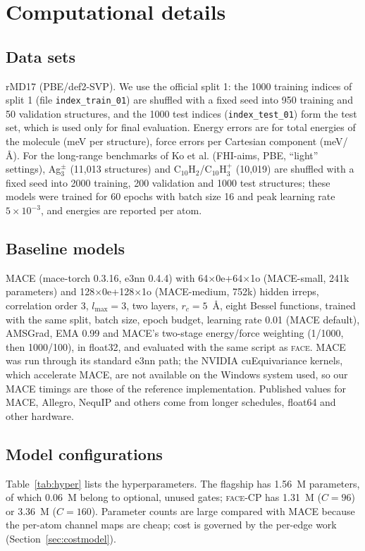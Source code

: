 \documentclass[journal=jctcce,manuscript=article,layout=traditional]{achemso}
\newcommand{\FACE}{\textup{\textsc{face}}}
\begin{document}
\section{Computational details}
\label{sec:compdetails}
\subsection{Data sets}
rMD17\cite{christensen2020rmd17} (PBE/def2-SVP). We use the official split 1: the 1000 training
indices of split 1 (file \texttt{index\_train\_01}) are shuffled with a fixed seed into 950 training and 50
validation structures, and the 1000 test indices (\texttt{index\_test\_01}) form the test set, which is used only for
final evaluation. Energy errors are for total energies of the molecule (meV per structure), force errors per
Cartesian component (meV/\AA). For the long-range benchmarks of Ko et al.\cite{ko2021} (FHI-aims, PBE, ``light''
settings), Ag$_3^{\pm}$ (11,013 structures) and C$_{10}$H$_2$/C$_{10}$H$_3^+$ (10,019) are shuffled with a fixed seed
into 2000 training, 200 validation and 1000 test structures; these models were trained for 60 epochs with batch size
16 and peak learning rate $5\times10^{-3}$, and energies are reported per atom.

\subsection{Baseline models}
MACE\cite{batatia2022mace} (mace-torch 0.3.16, e3nn 0.4.4) with 64$\times$0e+64$\times$1o
(MACE-small, 241k parameters) and 128$\times$0e+128$\times$1o (MACE-medium, 752k) hidden irreps, correlation order
3, $l_\text{max}=3$, two layers, $r_c=5$~\AA, eight Bessel functions, trained with the same split, batch size, epoch
budget, learning rate 0.01 (MACE default), AMSGrad, EMA 0.99 and MACE's two-stage energy/force weighting
(1/1000, then 1000/100), in float32, and evaluated with the same script as \FACE{}. MACE was run through its
standard e3nn path; the NVIDIA cuEquivariance kernels, which accelerate MACE, are not available on the Windows
system used, so our MACE timings are those of the reference implementation. Published values for MACE, Allegro,
NequIP and others come from longer schedules, float64 and other hardware.

\subsection{Model configurations}
Table~\ref{tab:hyper} lists the hyperparameters. The flagship has 1.56~M parameters, of which
0.06~M belong to optional, unused gates; \FACE-CP has 1.31~M ($C=96$) or 3.36~M ($C=160$). Parameter counts are large
compared with MACE because the per-atom channel maps are cheap; cost is governed by the per-edge work
(Section~\ref{sec:costmodel}).
\end{document}
